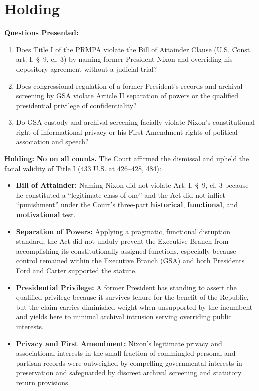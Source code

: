 \documentclass[12pt]{article}
\begin{document}
\section{Holding}
\textbf{Questions Presented:}

\begin{enumerate}
  \item Does Title I of the PRMPA violate the Bill of Attainder Clause (U.S. Const. art. I, \S~9, cl. 3) by naming former President Nixon and overriding his depository agreement without a judicial trial?
  \item Does congressional regulation of a former President's records and archival screening by GSA violate Article II separation of powers or the qualified presidential privilege of confidentiality?
  \item Do GSA custody and archival screening facially violate Nixon's constitutional right of informational privacy or his First Amendment rights of political association and speech?
\end{enumerate}

\textbf{Holding:} \textbf{No on all counts.} The Court affirmed the dismissal and upheld the facial validity of Title I (\href{https://supreme.justia.com/cases/federal/us/433/425/}{433 U.S. at 426--428, 484}):

\begin{itemize}
  \item \textbf{Bill of Attainder:} Naming Nixon did not violate Art. I, \S~9, cl. 3 because he constituted a ``legitimate class of one'' and the Act did not inflict ``punishment'' under the Court's three-part \textbf{historical}, \textbf{functional}, and \textbf{motivational} test.
  \item \textbf{Separation of Powers:} Applying a pragmatic, functional disruption standard, the Act did not unduly prevent the Executive Branch from accomplishing its constitutionally assigned functions, especially because control remained within the Executive Branch (GSA) and both Presidents Ford and Carter supported the statute.
  \item \textbf{Presidential Privilege:} A former President has standing to assert the qualified privilege because it survives tenure for the benefit of the Republic, but the claim carries diminished weight when unsupported by the incumbent and yields here to minimal archival intrusion serving overriding public interests.
  \item \textbf{Privacy and First Amendment:} Nixon's legitimate privacy and associational interests in the small fraction of commingled personal and partisan records were outweighed by compelling governmental interests in preservation and safeguarded by discreet archival screening and statutory return provisions.
\end{itemize}
\end{document}

